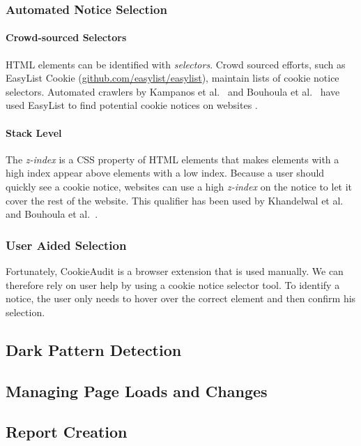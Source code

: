 \subsubsection{Automated Notice Selection}
\paragraph{Crowd-sourced Selectors}
HTML elements can be identified with \emph{selectors}. 
Crowd sourced efforts, such as EasyList Cookie (\href{https://github.com/easylist/easylist}{github.com/easylist/easylist}), maintain lists of cookie notice selectors.
Automated crawlers by Kampanos et al.~\cite{kampanos2021accept} and Bouhoula et al.~\cite{bouhoula2023automated} have used EasyList to find potential cookie notices on websites .
\paragraph{Stack Level}
The \emph{z-index} is a CSS property of HTML elements that makes elements with a high index appear above elements with a low index. 
Because a user should quickly see a cookie notice, websites can use a high \emph{z-index} on the notice to let it cover the rest of the website. 
This qualifier has been used by Khandelwal et al.~\cite{khandelwal2023automated} and Bouhoula et al.~\cite{bouhoula2023automated}.

\subsubsection{User Aided Selection}
Fortunately, CookieAudit is a browser extension that is used manually.
We can therefore rely on user help by using a cookie notice selector tool.
To identify a notice, the user only needs to hover over the correct element and then confirm his selection.

\subsection{Dark Pattern Detection}
\subsection{Managing Page Loads and Changes}
\subsection{Report Creation}
